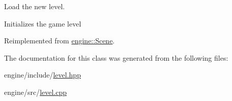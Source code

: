 Load the new level. 

Initializes the game level 

Reimplemented from \hyperlink{classengine_1_1_scene}{engine\+::\+Scene}.



The documentation for this class was generated from the following files\+:\begin{DoxyCompactItemize}
\item 
engine/include/\hyperlink{level_8hpp}{level.\+hpp}\item 
engine/src/\hyperlink{level_8cpp}{level.\+cpp}\end{DoxyCompactItemize}
